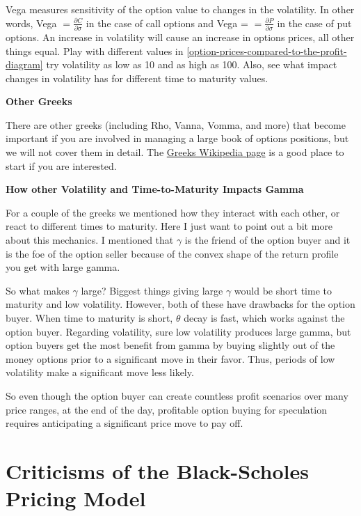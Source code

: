 \documentclass[
]{book}
\begin{document}
Vega measures sensitivity of the option value to changes in the volatility. In other words, Vega \(= \frac{\partial C}{\partial \sigma}\) in the case of call options and Vega = \(= \frac{\partial P}{\partial \sigma}\) in the case of put options. An increase in volatility will cause an increase in options prices, all other things equal. Play with different values in \ref{option-prices-compared-to-the-profit-diagram} try volatility as low as 10 and as high as 100. Also, see what impact changes in volatility has for different time to maturity values.

\textbf{Other Greeks}

There are other greeks (including Rho, Vanna, Vomma, and more) that become important if you are involved in managing a large book of options positions, but we will not cover them in detail. The \href{https://en.wikipedia.org/wiki/Greeks_(finance)}{Greeks Wikipedia page} is a good place to start if you are interested.

\textbf{How other Volatility and Time-to-Maturity Impacts Gamma}

For a couple of the greeks we mentioned how they interact with each other, or react to different times to maturity. Here I just want to point out a bit more about this mechanics. I mentioned that \(\gamma\) is the friend of the option buyer and it is the foe of the option seller because of the convex shape of the return profile you get with large gamma.

So what makes \(\gamma\) large? Biggest things giving large \(\gamma\) would be short time to maturity and low volatility. However, both of these have drawbacks for the option buyer. When time to maturity is short, \(\theta\) decay is fast, which works against the option buyer. Regarding volatility, sure low volatility produces large gamma, but option buyers get the most benefit from gamma by buying slightly out of the money options prior to a significant move in their favor. Thus, periods of low volatility make a significant move less likely.

So even though the option buyer can create countless profit scenarios over many price ranges, at the end of the day, profitable option buying for speculation requires anticipating a significant price move to pay off.

\hypertarget{criticisms-of-the-black-scholes-pricing-model}{%
\section{Criticisms of the Black-Scholes Pricing Model}\label{criticisms-of-the-black-scholes-pricing-model}}
\end{document}
